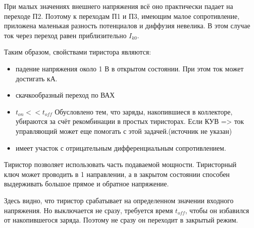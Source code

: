 При малых значениях внешнего напряжения всё оно практически падает на переходе П2. Поэтому к переходам П1 и П3, имеющим малое сопротивление, приложена маленькая разность потенциалов и диффузия невелика. В этом случае ток через переход равен приблизительно $I_{k0}$. 

Таким образом, свойствами тиристора являются:
\begin{itemize}
\item падение напряжения около 1 В в открытом состоянии. При этом ток может достигать кА.
\item скачкообразный переход по ВАХ
\item $t_{on} << t_{off}$ Обусловлено тем, что заряды, накопившиеся в коллекторе, убираются за счёт рекомбинации в простых тиристорах. Если КУВ => ток управляющий может еще помогать с этой задачей.(источник не указан)
\item имеет участок с отрицательным дифференциальным сопротивлением.

\end{itemize}

Тиристор позволяет использовать часть подаваемой мощности. Тиристорный ключ может проводить в 1 направлении, а в закрытом состоянии способен выдерживать большое прямое и обратное напряжение. 
\begin{center}
	\begin{figure}[h!]
		\caption{}	
	\end{figure}
\end{center}

Здесь видно, что тиристор срабатывает на определенном значении входного напряжения. Но выключается не сразу, требуется время $t_{off}$, чтобы он избавился от накопившегося заряда. Поэтому не сразу он переходит в закрытый режим.
